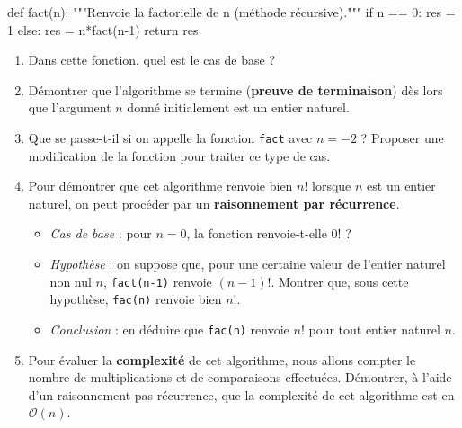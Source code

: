 \documentclass[
  a4paper,
  DIV=11,
  numbers=noendperiod]{scrartcl}
\newenvironment{Shaded}{\begin{snugshade}}{\end{snugshade}}
\newcommand{\CommentTok}[1]{\textcolor[rgb]{0.37,0.37,0.37}{#1}}
\newcommand{\ControlFlowTok}[1]{\textcolor[rgb]{0.00,0.23,0.31}{#1}}
\newcommand{\DecValTok}[1]{\textcolor[rgb]{0.68,0.00,0.00}{#1}}
\newcommand{\KeywordTok}[1]{\textcolor[rgb]{0.00,0.23,0.31}{#1}}
\newcommand{\NormalTok}[1]{\textcolor[rgb]{0.00,0.23,0.31}{#1}}
\newcommand{\OperatorTok}[1]{\textcolor[rgb]{0.37,0.37,0.37}{#1}}
\providecommand{\tightlist}{%
  \setlength{\itemsep}{0pt}\setlength{\parskip}{0pt}}\usepackage{longtable,booktabs,array}
\begin{document}
\begin{Shaded}
\begin{Highlighting}[]
  \KeywordTok{def}\NormalTok{ fact(n):}
    \CommentTok{"""Renvoie la factorielle de n (méthode récursive)."""}
    \ControlFlowTok{if}\NormalTok{ n }\OperatorTok{==} \DecValTok{0}\NormalTok{:}
\NormalTok{      res }\OperatorTok{=} \DecValTok{1}
    \ControlFlowTok{else}\NormalTok{:}
\NormalTok{      res }\OperatorTok{=}\NormalTok{ n}\OperatorTok{*}\NormalTok{fact(n}\OperatorTok{{-}}\DecValTok{1}\NormalTok{)}
    \ControlFlowTok{return}\NormalTok{ res}
\end{Highlighting}
\end{Shaded}

\begin{enumerate}
\def\labelenumi{\arabic{enumi}.}
\item
  Dans cette fonction, quel est le cas de base ?
\item
  Démontrer que l'algorithme se termine (\textbf{preuve de terminaison})
  dès lors que l'argument \(n\) donné initialement est un entier
  naturel.
\item
  Que se passe-t-il si on appelle la fonction \texttt{fact} avec
  \(n=-2\) ? Proposer une modification de la fonction pour traiter ce
  type de cas.
\item
  Pour démontrer que cet algorithme renvoie bien \(n!\) lorsque \(n\)
  est un entier naturel, on peut procéder par un \textbf{raisonnement
  par récurrence}.

  \begin{itemize}
  \tightlist
  \item
    \emph{Cas de base} : pour \(n=0\), la fonction renvoie-t-elle \(0!\)
    ?
  \item
    \emph{Hypothèse} : on suppose que, pour une certaine valeur de
    l'entier naturel non nul \(n\), \texttt{fact(n-1)} renvoie
    \((n-1)!\). Montrer que, sous cette hypothèse, \texttt{fac(n)}
    renvoie bien \(n!\).
  \item
    \emph{Conclusion} : en déduire que \texttt{fac(n)} renvoie \(n!\)
    pour tout entier naturel \(n\).
  \end{itemize}
\item
  Pour évaluer la \textbf{complexité} de cet algorithme, nous allons
  compter le nombre de multiplications et de comparaisons effectuées.
  Démontrer, à l'aide d'un raisonnement pas récurrence, que la
  complexité de cet algorithme est en \(\mathcal{O}(n)\).
\end{enumerate}
\end{document}
